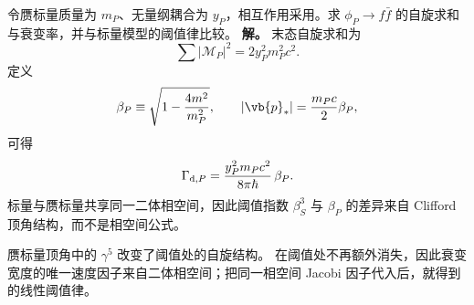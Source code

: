 \begin{exbox}
令赝标量质量为 $m_P$、无量纲耦合为 $y_P$，相互作用采用。求 $\phi_P\to f\bar f$ 的自旋求和与衰变率，并与标量模型的阈值律比较。
\textbf{解。} 末态自旋求和为
\begin{equation}
 {
 \sum|\mathcal M_P|^2=2y_P^2m_P^2c^2.}
 \label{eq:yukawa-pseudo-decay-M2-si-r10}
\end{equation}
定义
\begin{equation}
 \beta_P\equiv\sqrt{1-\frac{4m^2}{m_P^2}},
 \qquad
 |\vb{p}_*|=\frac{m_Pc}{2}\beta_P,
 \label{eq:yukawa-pseudo-beta-si-r15}
\end{equation}
可得
\begin{equation}
 {
 \Gamma_{{\rm d},P}
 =\frac{y_P^2m_P c^2}{8\pi\hbar}\,\beta_P.}
 \label{eq:yukawa-pseudo-decay-width-si-r10}
\end{equation}
标量与赝标量共享同一二体相空间，因此阈值指数 $\beta_S^3$ 与 $\beta_P$ 的差异来自 Clifford 顶角结构，而不是相空间公式。


\medskip

赝标量顶角中的 $\gamma^5$ 改变了阈值处的自旋结构。 在阈值处不再额外消失，因此衰变宽度的唯一速度因子来自二体相空间；把同一相空间 Jacobi 因子代入后，就得到 的线性阈值律。


\end{exbox}

